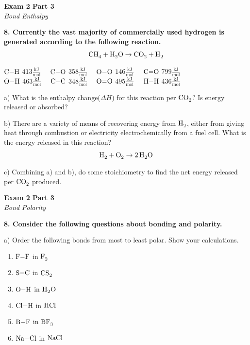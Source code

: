 \documentclass{article}
\begin{document}
    \begin{center}
        \textbf{Exam 2 Part 3}\\
        \textit{Bond Enthalpy}
    \end{center}
    \textbf{8. Currently the vast majority of commercially used hydrogen is generated according to the following reaction.}
    $$\ce{CH4} + \ce{H2O} \rightarrow \ce{CO2} + \ce{H2}$$
    \begin{center}
        $\ce{C-H}$ $413 \frac{\si{\kilo\joule}}{\si{\mol}} \quad$
        $\ce{C-O}$ $358 \frac{\si{\kilo\joule}}{\si{\mol}} \quad$
        $\ce{O-O}$ $146 \frac{\si{\kilo\joule}}{\si{\mol}} \quad$
        $\ce{C=O}$ $799 \frac{\si{\kilo\joule}}{\si{\mol}}$\\[.2cm]
        $\ce{O-H}$ $463 \frac{\si{\kilo\joule}}{\si{\mol}} \quad$
        $\ce{C-C}$ $348 \frac{\si{\kilo\joule}}{\si{\mol}} \quad$
        $\ce{O=O}$ $495 \frac{\si{\kilo\joule}}{\si{\mol}} \quad$
        $\ce{H-H}$ $436 \frac{\si{\kilo\joule}}{\si{\mol}}$
    \end{center}

    a) What is the enthalpy change($\Delta H$) for this reaction per $\ce{CO2}$? Is energy released or absorbed?

    b) There are a variety of means of recovering energy from $\ce{H2}$, either from giving heat through combustion or electricity electrochemically from a fuel cell. What is the energy released in this reaction?
    $$\ce{H2} + \ce{O2} \rightarrow \ce{2H2O}$$

    c) Combining a) and b), do some stoichiometry to find the net energy released per $\ce{CO2}$ produced.
    \pagebreak

    \begin{center}
        \textbf{Exam 2 Part 3}\\
        \textit{Bond Polarity}
    \end{center}
    \textbf{8. Consider the following questions about bonding and polarity.}

    a) Order the following bonds from most to least polar. Show your calculations.
    \begin{enumerate}
        \item $\ce{F-F}$ in $\ce{F2}$
        \item $\ce{S=C}$ in $\ce{CS2}$
        \item $\ce{O-H}$ in $\ce{H2O}$
        \item $\ce{Cl-H}$ in $\ce{HCl}$
        \item $\ce{B-F}$ in $\ce{BF3}$
        \item $\ce{Na-Cl}$ in $\ce{NaCl}$
    \end{enumerate}
\end{document}
